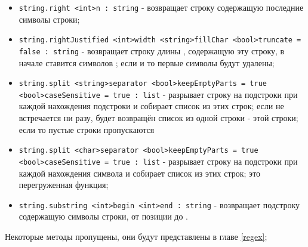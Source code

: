 \documentclass[a4paper, 14pt]{extarticle}
\newenvironment{icItems}
	{ \begin{itemize} [noitemsep,nolistsep] }
	{ \end{itemize} }
\begin{document}
\begin{icItems}
\item
	\lstinline|string.right <int>n : string| - возвращает строку содержащую последние  символы строки;
\item
	\lstinline|string.rightJustified <int>width <string>fillChar <bool>truncate = false : string| - возвращает строку длины , содержащую эту строку, в начале ставится  символов ; если  и  то первые  символы будут удалены;
\item
	\lstinline|string.split <string>separator <bool>keepEmptyParts = true <bool>caseSensitive = true : list| - разрывает строку на подстроки при каждой нахождения подстроки  и собирает список из этих строк; если  не встречается ни разу, будет возвращён список из одной строки - этой строки; если  то пустые строки пропускаются
\item
	\lstinline|string.split <char>separator <bool>keepEmptyParts = true <bool>caseSensitive = true : list| - разрывает строку на подстроки при каждой нахождения символа  и собирает список из этих строк; это перегруженная функция;
\item
	\lstinline|string.substring <int>begin <int>end : string| - возвращает подстроку содержащую символы строки, от позиции  до .
\end{icItems}

Некоторые методы пропущены, они будут представлены в главе \ref{regex};
\end{document}
